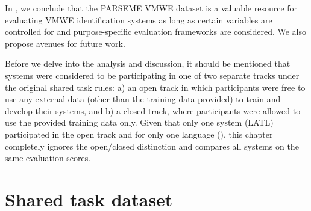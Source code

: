 \documentclass[output=paper,modfonts,nonflat,draftmode]{langsci/langscibook}
\begin{document}



In , we conclude that the PARSEME VMWE dataset is a valuable resource for evaluating VMWE identification systems as long as certain variables are controlled for and purpose-specific evaluation frameworks are considered. We also propose avenues for future work.


Before we delve into the analysis and discussion, it should be mentioned that systems were considered to be participating in one of two separate tracks under the original shared task rules: a) an open track in which participants were free to use any external data (other than the training data provided) to train and develop their systems, and b) a closed track, where participants were allowed to use the provided training data only. Given that only one system (LATL) participated in the open track and for only one language (), this chapter completely ignores the open/closed distinction and compares all systems on the same evaluation scores.

\section{\label{sec:dataset}Shared task dataset}
\end{document}
